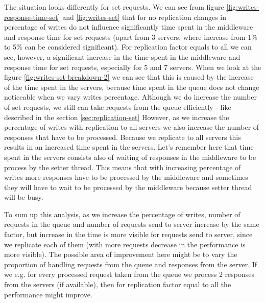\documentclass[11pt]{article}
\begin{document}
The situation looks differently for set requests. We can see from figure \ref{fig:writes-response-time-set} and  \ref{fig:writes-set} that for no replication changes in percentage of writes do not influence significantly time spent in the middleware and response time for set requests (apart from 3 servers, where increase from 1\% to 5\% can be considered significant). For replication factor equals to all we can see, however, a significant increase in the time spent in the middleware and response time for set requests, especially for 5 and 7 servers. When we look at the figure \ref{fig:writes-set-breakdown-2} we can see that this is caused by the increase of the time spent in the servers, because time spent in the queue does not change noticeable when we vary writes percentage. Although we do increase the number of set requests, we still can take requests from the queue efficiently - like described in the section \ref{sec:replication-set}
%
However, as we increase the percentage of writes with replication to all servers we also increase the number of responses that have to be processed. Because we replicate to all servers this results in an increased time spent in the servers. Let's remember here that time spent in the servers consists also of waiting of responses in the middleware to be process by the setter thread. This means that with increasing percentage of writes more responses have to be processed by the middleware and sometimes they will have to wait to be processed by the middleware because setter thread will be busy. 

To sum up this analysis, as we increase the percentage of writes, number of requests in the queue and number of requests send to server increase by the same factor, but increase in the time is more visible for requests send to server, since we replicate each of them (with more requests decrease in the performance is more visible). The possible area of improvement here might be to vary the proportion of handling requests from the queue and responses from the server. If we e.g. for every processed request taken from the queue we process 2 responses from the servers (if available), then for replication factor equal to all the performance might improve.
\end{document}
